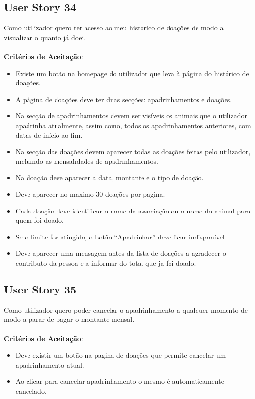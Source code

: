 \documentclass[a4paper,11pt]{article}
\begin{document}
\subsection{User Story 34}
Como utilizador quero ter acesso ao meu historico de doações de modo a visualizar o quanto já doei.\\\\
\textbf{Critérios de Aceitação}:
\begin{itemize}
  \item Existe um botão na homepage do utilizador que leva à página do histórico de doações.
  \item A página de doações deve ter duas secções: apadrinhamentos e doações.
  \item Na secção de apadrinhamentos devem ser visíveis os animais que o utilizador apadrinha atualmente, assim como, todos os apadrinhamentos anteriores, com datas de início ao fim.
  \item Na secção das doações devem aparecer todas as doações feitas pelo utilizador, incluindo as mensalidades de apadrinhamentos.
  \item Na doação deve aparecer a data, montante e o tipo de doação.
  \item Deve aparecer no maximo 30 doações por pagina.
  \item Cada doação deve identificar o nome da associação ou o nome do animal para quem foi doado.
  \item Se o limite for atingido, o botão “Apadrinhar” deve ficar indisponível.
  \item Deve aparecer uma mensagem antes da lista de doações a agradecer o contributo da pessoa e a informar do total que ja foi doado.
\end{itemize}

\subsection{User Story 35}
Como utilizador quero poder cancelar o apadrinhamento a qualquer momento de modo a parar de pagar o montante mensal.\\\\
\textbf{Critérios de Aceitação}:
\begin{itemize}
  \item Deve existir um botão na pagina de doações que permite cancelar um apadrinhamento atual.
  \item Ao clicar para cancelar apadrinhamento o mesmo é automaticamente cancelado,
\end{itemize}
\end{document}
